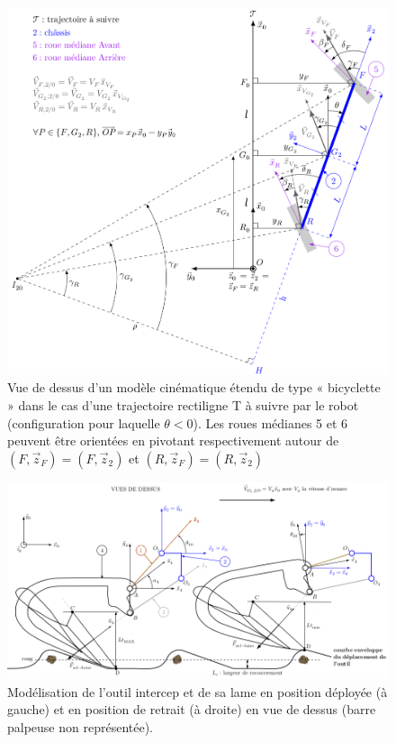 \begin{figure}[!h]
\centering\includegraphics[width=0.85\linewidth]{img/figA.png} \caption{Vue de dessus d'un modèle cinématique étendu de type « bicyclette » dans le cas d'une trajectoire rectiligne T à suivre par le robot (configuration pour laquelle $\theta < 0$). Les roues médianes 5 et 6 peuvent être orientées en pivotant respectivement autour de $(F,\vec{z}_F) = (F,\vec{z}_2)$ et $(R,\vec{z}_F) = (R,\vec{z}_2)$}
 \label{annexeA}
\end{figure}

\newpage

\begin{figure}[!h]
\centering\includegraphics[width=1.3\linewidth,angle=90]{img/figE.png} \caption{Modélisation de l'outil intercep et de sa lame en position déployée (à gauche) et en position de retrait (à droite) en vue de dessus (barre palpeuse non représentée).}
 \label{annexeE}
\end{figure}

